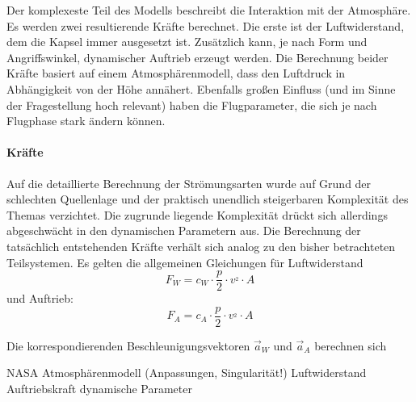 Der komplexeste Teil des Modells beschreibt die Interaktion mit der Atmosphäre. Es werden zwei resultierende Kräfte berechnet. Die erste ist der Luftwiderstand, dem die Kapsel immer ausgesetzt ist. Zusätzlich kann, je nach Form und Angriffswinkel, dynamischer Auftrieb erzeugt werden. Die Berechnung beider Kräfte basiert auf einem Atmosphärenmodell, dass den Luftdruck in Abhängigkeit von der Höhe annähert. Ebenfalls großen Einfluss (und im Sinne der Fragestellung hoch relevant) haben die Flugparameter, die sich je nach Flugphase stark ändern können.

\paragraph{Kräfte}
Auf die detaillierte Berechnung der Strömungsarten wurde auf Grund der schlechten Quellenlage und der praktisch unendlich steigerbaren Komplexität des Themas verzichtet. Die zugrunde liegende Komplexität drückt sich allerdings abgeschwächt in den dynamischen Parametern aus. Die Berechnung der tatsächlich entstehenden Kräfte verhält sich analog zu den bisher betrachteten Teilsystemen. Es gelten die allgemeinen Gleichungen für Luftwiderstand
$$F_W = c_W \cdot \frac{p}{2} \cdot v^_{2} \cdot A $$
und Auftrieb:
$$F_A = c_A \cdot \frac{p}{2} \cdot v^_{2} \cdot A $$

Die korrespondierenden Beschleunigungsvektoren $\vec a_W$ und $\vec a_A$ berechnen sich

		NASA Atmosphärenmodell (Anpassungen, Singularität!)
			Luftwiderstand
			Auftriebskraft
		dynamische Parameter